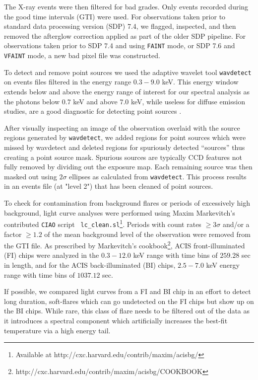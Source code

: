 \documentclass{emulateapj}
\begin{document}
The X-ray events were then filtered for bad grades. Only events
recorded during the good time intervals (GTI) were used. For
observations taken prior to standard data processing version (SDP)
7.4, we flagged, inspected, and then removed the afterglow correction
applied as part of the older SDP pipeline. For observations taken
prior to SDP 7.4 and using {\tt FAINT} mode, or SDP 7.6 and {\tt
VFAINT} mode, a new bad pixel file was constructed.

To detect and remove point sources we used the adaptive wavelet 
tool {\tt wavdetect} \citep{2002ApJS..138..185F} on events files
filtered in the energy range $0.3-9.0$ keV. This energy window extends
below and above the energy range of interest for our spectral analysis
as the photons below $0.7$ keV and above $7.0$ keV, while useless
for diffuse emission studies, are a good diagnostic for detecting
point sources \citep{2000SPIE.4012...17J}. 

After visually inspecting an image of the observation overlaid with
the source regions generated by {\tt wavdetect}, we added regions for point
sources which were missed by wavdetect and deleted regions for
spuriously detected ``sources'' thus creating a point source
mask. Spurious sources are typically CCD features not fully removed by
dividing out the exposure map. Each remaining source was then masked out using
$2\sigma$ ellipses as calculated from {\tt wavdetect}. This process
results in an events file (at "level 2") that has been cleaned of
point sources.

To check for contamination from background flares or periods of
excessively high background, light curve analyses were performed using
Maxim Markevitch's contributed {\tt CIAO} script {\tt
lc\_clean.sl}\footnote{Available at
http://cxc.harvard.edu/contrib/maxim/acisbg/}. Periods with count
rates $\geq 3\sigma$ and/or a factor $\geq 1.2$ of the mean background
level of the observation were removed from the GTI file. As prescribed
by Markevitch's
cookbook\footnote{http://cxc.harvard.edu/contrib/maxim/acisbg/COOKBOOK},
ACIS front-illuminated (FI) chips were analyzed in the $0.3-12.0$ keV
range with time bins of $259.28$ sec in length, and for the ACIS
back-illuminated (BI) chips, $2.5-7.0$ keV energy range with time bins
of $1037.12$ sec.

If possible, we compared light curves from a FI and BI chip in an
effort to detect long duration, soft-flares which can go undetected on
the FI chips but show up on the BI chips. While rare, this class of
flare needs to be filtered out of the data as it introduces a spectral
component which artificially increases the best-fit temperature via a
high energy tail.
\end{document}

